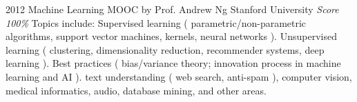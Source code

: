 \documentclass[11pt,a4paper]{moderncv}
\begin{document}
\cventry                                                          %
    {2012}                                                          %
    {Machine Learning}                                                          %
    {MOOC by Prof. Andrew Ng}                                                          %
    {Stanford University}                                                          %
    {\textit{Score 100\%}}                                                          %
    {                                                          %
        Topics include:                                                          %
            Supervised learning (                                                %
                    parametric/non-parametric algorithms,                        %
                    support vector machines,                                     %
                    kernels,                                                     %
                    neural networks                                              %
                ).                                                               %
            Unsupervised learning (                                              %
                    clustering,                                                  %
                    dimensionality reduction,                                    %
                    recommender systems,                                         %
                    deep learning                                                %
                ).                                                               %
            Best practices (                                                     %
                    bias/variance theory;                                        %
                    innovation process in machine learning and AI                %
                ).                                                               %
                text understanding (                                             %
                    web search,                                                  %
                    anti-spam                                                    %
                ),                                                               %
                computer vision,                                                 %
                medical informatics,                                             %
                audio,                                                           %
                database mining,                                                 %
                and other areas.                                                 %
    }                                                          %
\end{document}
